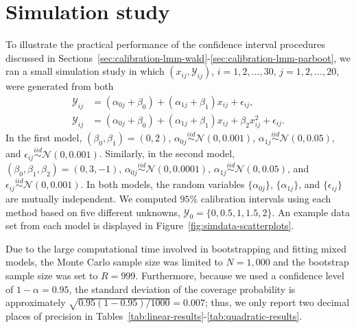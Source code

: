 \documentclass[cmfont,usenames,dvipsnames,leqno]{afit-etd}\usepackage[]{graphicx}\usepackage[]{color}
\begin{document}
\section{Simulation study}
\label{sec:simulation-study}
To illustrate the practical performance of the confidence interval procedures discussed in Sections~\ref{sec:calibration-lmm-wald}-\ref{sec:calibration-lmm-parboot}, we ran a small simulation study in which $\left(x_{ij}, \mathcal{Y}_{ij}\right)$, $i = 1, 2, \dotsc, 30$, $j = 1, 2, \dotsc, 20$, were generated from both
\begin{align*}
  \mathcal{Y}_{ij} &= \left(\alpha_{0j} + \beta_0\right) + \left(\alpha_{1j} + \beta_1\right)x_{ij} + \epsilon_{ij}, \\
  \mathcal{Y}_{ij} &= \left(\alpha_{0j} + \beta_0\right) + \left(\alpha_{1j} + \beta_1\right)x_{ij} + \beta_2 x_{ij}^2 + \epsilon_{ij}.
\end{align*}
In the first model, $\left(\beta_0, \beta_1\right) = \left(0, 2\right)$, $\alpha_{0j} \stackrel{iid}{\sim} \mathcal{N}\left(0, 0.001\right)$, $\alpha_{1j} \stackrel{iid}{\sim} \mathcal{N}\left(0, 0.05\right)$, and $\epsilon_{ij} \stackrel{iid}{\sim} \mathcal{N}\left(0, 0.001\right)$. Similarly, in the second model, $\left(\beta_0, \beta_1, \beta_2\right) = \left(0, 3, -1\right)$, $\alpha_{0j} \stackrel{iid}{\sim} \mathcal{N}\left(0, 0.0001\right)$, $\alpha_{1j} \stackrel{iid}{\sim} \mathcal{N}\left(0, 0.05\right)$, and $\epsilon_{ij} \stackrel{iid}{\sim} \mathcal{N}\left(0, 0.001\right)$. In both models, the random variables $\big\{\alpha_{0j}\big\}$, $\big\{\alpha_{1j}\big\}$, and $\big\{\epsilon_{ij}\big\}$ are mutually independent. We computed $95\%$ calibration intervals using each method based on five different unknowns, $\mathcal{Y}_0 = \big\{0, 0.5, 1, 1.5, 2\big\}$. An example data set from each model is displayed in Figure~\ref{fig:simdata-scatterplots}.

Due to the large computational time involved in bootstrapping and fitting mixed models, the Monte Carlo sample size was limited to $N = 1,000$ and the bootstrap sample size was set to $R = 999$. Furthermore, because we used a confidence level of $1-\alpha = 0.95$, the standard deviation of the coverage probability is approximately $\sqrt{0.95\left(1-0.95\right)/1000} = 0.007$; thus, we only report two decimal places of precision in Tables~\ref{tab:linear-results}-\ref{tab:quadratic-results}. 
\end{document}
